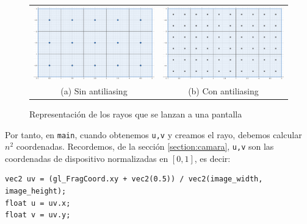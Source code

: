 \begin{figure}[ht]
    \centering
    \begin{tabular}{cc}
        \includegraphics[scale=0.20]{img/C7/pixeles-sin-antiliasing.png} &
      \includegraphics[scale=0.20]{img/C7/pixeles-con-antiliasing.png} \\    
    (a) Sin antiliasing & (b) Con antiliasing  \\
    \end{tabular}
    \caption{Representación de los rayos que se lanzan a una pantalla}
    \label{fig:pantalla-antiliasing}
\end{figure}

Por tanto, en \verb|main|, cuando obtenemos \verb|u,v| y creamos el rayo, debemos calcular $n^2$ coordenadas. Recordemos, de la sección \ref{section:camara}, \verb|u,v| son las coordenadas de dispositivo normalizadas en $[0,1]$, es decir:
\begin{lstlisting}
vec2 uv = (gl_FragCoord.xy + vec2(0.5)) / vec2(image_width, image_height);
float u = uv.x;
float v = uv.y;
\end{lstlisting}

